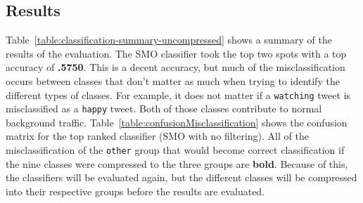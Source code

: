 \documentclass[12pt]{ucthesis}
\begin{document}
\begin{table}[H]
   \begin{center}
      \caption[Example Classification Confusion Matrix]{A example confusion matrix for a classifier. The \texttt{undecided} class was removed because there were no tweets in that class.}
      \label{table:confusionExample}
   \end{center}
\end{table}

\subsection{Results}
\label{class-evaluation-results}
Table~\ref{table:classification-summary-uncompressed} shows a summary of the results of the evaluation.
The SMO classifier took the top two spots with a top accuracy of \textbf{.5750}.
This is a decent accuracy, but much of the misclassification occurs between classes that don't matter
as much when trying to identify the different types of classes. For example, it does not matter if
a \texttt{watching} tweet is misclassified as a \texttt{happy} tweet. Both of those classes contribute to
normal background traffic. Table~\ref{table:confusionMisclassification} shows the confusion matrix for the top
ranked classifier (SMO with no filtering). All of the misclassification of the \texttt{other} group that
would become correct classification if the nine classes were compressed to the three groups are \textbf{bold}.
Because of this, the classifiers will be evaluated again, but the different classes
will be compressed into their respective groups before the results are evaluated.
\end{document}
